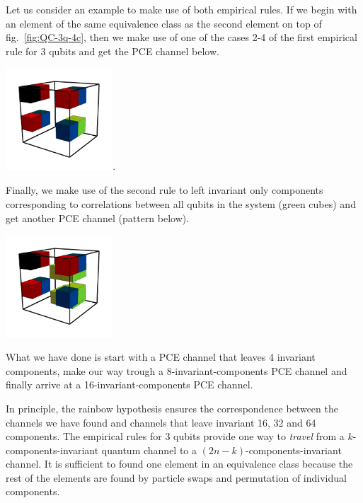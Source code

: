 \documentclass[11pt,dvipsnames]{article} %
\newcommand{\fref}[1]{fig.~\ref{#1}}
\newcommand{\1}{\mathds{1}}
\begin{document}
Let us consider an example to make use of both empirical rules. If we 
begin with an element of the same equivalence class as the second
element on top of \fref{fig:QC-3q-4c}, then we make use of one of 
the cases 2-4 of the first empirical rule for 3 qubits and get the PCE channel below.
\begin{center}
	\includegraphics[width=4cm]{3q-8c-je}.
\end{center}
Finally, we make use of the second rule to left invariant only components
corresponding to correlations between all qubits in the system (green cubes)
and get another PCE channel (pattern below).
\begin{center}
	\includegraphics[width=4cm]{3q-8c}
\end{center}
What we have done is start with a PCE channel that leaves 4 invariant
components, make our way trough a 8-invariant-components PCE channel and 
finally arrive at a 16-invariant-components PCE channel.

In principle, the rainbow hypothesis ensures the correspondence between  
the channels we have found and channels that leave invariant 16, 32 and 64
components. The empirical rules for 3 qubits provide one way to \textit{travel}
from a $k$-components-invariant quantum channel to a
$(2n-k)$-components-invariant channel.
It is sufficient to found one element in an 
equivalence class because the rest of the elements are found 
by particle swaps and permutation of individual components.
\end{document}
